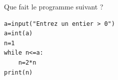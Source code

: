 \begin{exo}{}
	Que fait le programme suivant ?

	\begin{lstlisting}
a=input("Entrez un entier > 0")
a=int(a)
n=1
while n<=a:
    n=2*n
print(n)
\end{lstlisting}
\end{exo}
